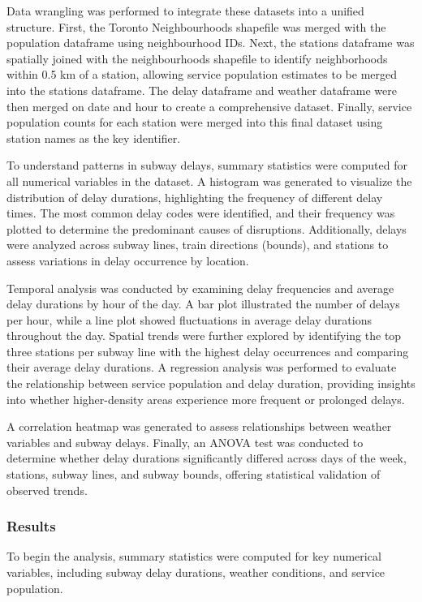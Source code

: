 \documentclass[
  letterpaper,
  DIV=11,
  numbers=noendperiod]{scrartcl}
\begin{document}
Data wrangling was performed to integrate these datasets into a unified
structure. First, the Toronto Neighbourhoods shapefile was merged with
the population dataframe using neighbourhood IDs. Next, the stations
dataframe was spatially joined with the neighbourhoods shapefile to
identify neighborhoods within 0.5 km of a station, allowing service
population estimates to be merged into the stations dataframe. The delay
dataframe and weather dataframe were then merged on date and hour to
create a comprehensive dataset. Finally, service population counts for
each station were merged into this final dataset using station names as
the key identifier.

To understand patterns in subway delays, summary statistics were
computed for all numerical variables in the dataset. A histogram was
generated to visualize the distribution of delay durations, highlighting
the frequency of different delay times. The most common delay codes were
identified, and their frequency was plotted to determine the predominant
causes of disruptions. Additionally, delays were analyzed across subway
lines, train directions (bounds), and stations to assess variations in
delay occurrence by location.

Temporal analysis was conducted by examining delay frequencies and
average delay durations by hour of the day. A bar plot illustrated the
number of delays per hour, while a line plot showed fluctuations in
average delay durations throughout the day. Spatial trends were further
explored by identifying the top three stations per subway line with the
highest delay occurrences and comparing their average delay durations. A
regression analysis was performed to evaluate the relationship between
service population and delay duration, providing insights into whether
higher-density areas experience more frequent or prolonged delays.

A correlation heatmap was generated to assess relationships between
weather variables and subway delays. Finally, an ANOVA test was
conducted to determine whether delay durations significantly differed
across days of the week, stations, subway lines, and subway bounds,
offering statistical validation of observed trends.

\subsubsection{Results}\label{results}

To begin the analysis, summary statistics were computed for key
numerical variables, including subway delay durations, weather
conditions, and service population.
\end{document}
